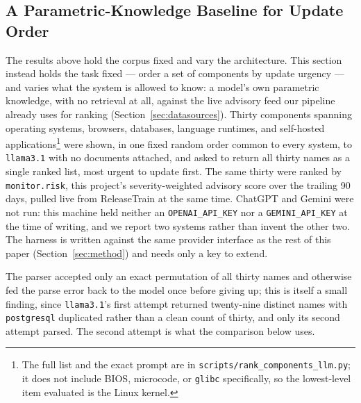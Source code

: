 \documentclass[acmsmall,review,anonymous,screen]{acmart}
\begin{document}
\subsection{A Parametric-Knowledge Baseline for Update Order}\label{sec:update-order-baseline}

The results above hold the corpus fixed and vary the architecture. This
section instead holds the task fixed --- order a set of components by update
urgency --- and varies what the system is allowed to know: a model's own
parametric knowledge, with no retrieval at all, against the live
advisory feed our pipeline already uses for ranking
(Section~\ref{sec:datasources}). Thirty components spanning operating
systems, browsers, databases, language runtimes, and self-hosted
applications\footnote{The full list and the exact prompt are in
\texttt{scripts/rank\_components\_llm.py}; it does not include BIOS,
microcode, or \texttt{glibc} specifically, so the lowest-level item evaluated
is the Linux kernel.} were shown, in one fixed random order common to every
system, to \texttt{llama3.1} with no documents attached, and asked to return
all thirty names as a single ranked list, most urgent to update first. The
same thirty were ranked by \texttt{monitor.risk}, this project's
severity-weighted advisory score over the trailing 90 days, pulled live from
ReleaseTrain at the same time. ChatGPT and Gemini were not run: this
machine held neither an \texttt{OPENAI\_API\_KEY} nor a
\texttt{GEMINI\_API\_KEY} at the time of writing, and we report two systems
rather than invent the other two. The harness is written against the same
provider interface as the rest of this paper (Section~\ref{sec:method}) and
needs only a key to extend.

The parser accepted only an exact permutation of all thirty names and
otherwise fed the parse error back to the model once before giving up; this
is itself a small finding, since \texttt{llama3.1}'s first attempt returned
twenty-nine distinct names with \texttt{postgresql} duplicated rather than a
clean count of thirty, and only its second attempt parsed. The second attempt
is what the comparison below uses.
\end{document}

